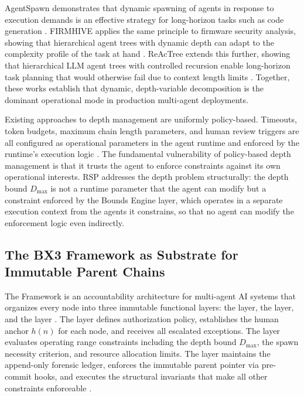 AgentSpawn demonstrates that dynamic spawning of agents in response to execution demands is an effective strategy for long-horizon tasks such as code generation \cite{agentspawn2025}. FIRMHIVE applies the same principle to firmware security analysis, showing that hierarchical agent trees with dynamic depth can adapt to the complexity profile of the task at hand \cite{firmhive2025}. ReAcTree extends this further, showing that hierarchical LLM agent trees with controlled recursion enable long-horizon task planning that would otherwise fail due to context length limits \cite{reactree2025}. Together, these works establish that dynamic, depth-variable decomposition is the dominant operational mode in production multi-agent deployments.

Existing approaches to depth management are uniformly policy-based. Timeouts, token budgets, maximum chain length parameters, and human review triggers are all configured as operational parameters in the agent runtime and enforced by the runtime's execution logic \cite{multi_agent_coordination_strategies}. The fundamental vulnerability of policy-based depth management is that it trusts the agent to enforce constraints against its own operational interests. RSP addresses the depth problem structurally: the depth bound $D_{\max}$ is not a runtime parameter that the agent can modify but a constraint enforced by the \bxthree{} Bounds Engine layer, which operates in a separate execution context from the agents it constrains, so that no agent can modify the enforcement logic even indirectly.

\subsection{The BX3 Framework as Substrate for Immutable Parent Chains}\label{sec:bx3-substrate}

The \bxthree{} Framework is an accountability architecture for multi-agent AI systems that organizes every node into three immutable functional layers: the \purpose{} layer, the \bounds{} layer, and the \fact{} layer \cite{bx3framework}. The \purpose{} layer defines authorization policy, establishes the human anchor $h(n)$ for each node, and receives all escalated exceptions. The \bounds{} layer evaluates operating range constraints including the depth bound $D_{\max}$, the spawn necessity criterion, and resource allocation limits. The \fact{} layer maintains the append-only forensic ledger, enforces the immutable parent pointer via pre-commit hooks, and executes the structural invariants that make all other constraints enforceable \cite{bx3framework}.

